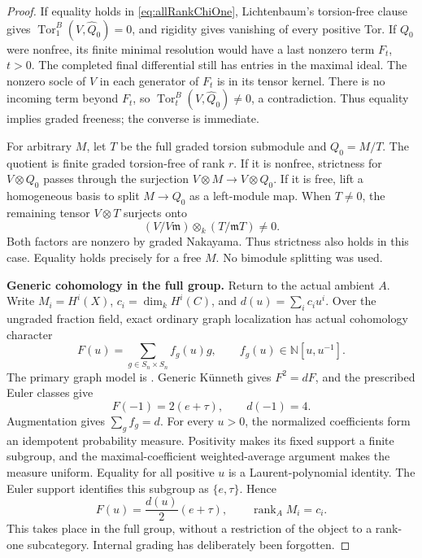 \begin{proof}
If equality holds in \eqref{eq:allRankChiOne},
Lichtenbaum's torsion-free clause gives
\(\operatorname{Tor}_1^B(V,\widehat Q_0)=0\),
and rigidity gives vanishing of every positive Tor.
If \(Q_0\) were nonfree, its finite minimal resolution
would have a last nonzero term \(F_t\), \(t>0\).
The completed final differential still has entries
in the maximal ideal. The nonzero socle of \(V\)
in each generator of \(F_t\) is in its tensor kernel.
There is no incoming term beyond \(F_t\), so
\(\operatorname{Tor}_t^B(V,\widehat Q_0)\ne0\),
a contradiction. Thus equality implies graded
freeness; the converse is immediate.

For arbitrary \(M\), let \(T\) be the full graded
torsion submodule and \(Q_0=M/T\). The quotient is
finite graded torsion-free of rank \(r\).
If it is nonfree, strictness for \(V\otimes Q_0\)
passes through the surjection \(V\otimes M\to
V\otimes Q_0\). If it is free, lift a homogeneous
basis to split \(M\to Q_0\) as a left-module map.
When \(T\ne0\), the remaining tensor \(V\otimes T\)
surjects onto
\[
 (V/V\mathfrak m)\otimes_k(T/\mathfrak mT)\ne0.
\]
Both factors are nonzero by graded Nakayama.
Thus strictness also holds in this case.
Equality holds precisely for a free \(M\).
No bimodule splitting was used.

\par\smallskip\noindent\textbf{Generic cohomology in the full group.}\quad
Return to the actual ambient \(A\).
Write \(M_i=H^i(X)\), \(c_i=\dim_kH^i(C)\),
and \(d(u)=\sum_i c_i u^i\).
Over the ungraded fraction field, exact ordinary
graph localization has actual cohomology character
\[
 F(u)=\sum_{g\in S_n\times S_n}f_g(u)g,
 \qquad f_g(u)\in\mathbb N[u,u^{-1}].
\]
The primary graph model is
\cite[\S\S1.1--1.2, equations (1.1)--(1.2),
Theorem~1.6 and Remark~1.7]{EWLocalized}.
Generic K\"unneth gives \(F^2=dF\), and the
prescribed Euler classes give
\[
                    F(-1)=2(e+\tau),\qquad d(-1)=4.
\]
Augmentation gives \(\sum_gf_g=d\).
For every \(u>0\), the normalized coefficients
form an idempotent probability measure.
Positivity makes its fixed support a finite subgroup,
and the maximal-coefficient weighted-average argument
makes the measure uniform. Equality for all positive
\(u\) is a Laurent-polynomial identity.
The Euler support identifies this subgroup as
\(\{e,\tau\}\). Hence
\begin{equation}\label{eq:allRankUniformGraphs}
 F(u)=\frac{d(u)}2(e+\tau),\qquad
 \operatorname{rank}_A M_i=c_i.
\end{equation}
This takes place in the full group, without a
restriction of the object to a rank-one subcategory.
Internal grading has deliberately been forgotten.


\end{proof}
